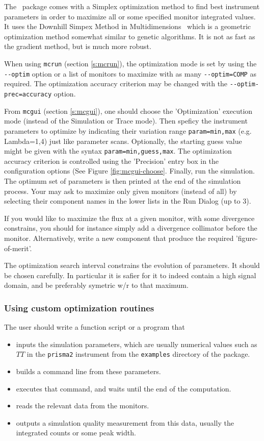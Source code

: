 The \MCS\ package comes with a Simplex optimization method to find best instrument parameters in order to maximize all or some specified monitor integrated values. It uses the Downhill Simpex Method in Multidimensions~\cite{neldermead,NumRecip} which is a geometric optimization method somewhat similar to genetic algorithms. It is not as fast as the gradient method, but is much more robust.

When using \verb+mcrun+ (section \ref{s:mcrun}), the optimization mode is set by using the
\verb+--optim+ option or a list of monitors to maximize with as many
\verb+--optim=COMP+ as required. The optimization accuracy criterion
may be changed with the \verb+--optim-prec=accuracy+ option.

From \verb+mcgui+ (section \ref{s:mcgui}), one should choose the
'Optimization' execution mode (instead of the Simulation or Trace
mode). Then speficy the instrument parameters to optimize by
indicating their variation range \verb+param=min,max+ (e.g. Lambda=1,4) just like
parameter scans. Optionally, the starting guess value might be given with the syntax \verb+param=min,guess,max+. The optimization accuracy criterion is controlled
using the 'Precision' entry box in the configuration options (See
Figure \ref{fig:mcgui-choose}. Finally, run the simulation. The optimum
set of parameters is then printed at the end of the simulation
process. Your may ask to maximize only given monitors (instead of all)
by selecting their component names in the lower lists in the Run Dialog (up to 3).

If you would like to maximize the flux at a given monitor, with some
divergence constrains, you should for instance simply add a divergence
collimator before the monitor. Alternatively, write a new component
that produce the required 'figure-of-merit'.

The optimization search interval constrains the evolution of parameters. It should be chosen carefully. In particular it is safier for it to indeed contain a high signal domain, and be preferably symetric w/r to that maximum.

\subsubsection{Using custom optimization routines}
The user should write a function script or a program that
\begin{itemize}
\item inputs the simulation parameters, which are usually numerical values such as $TT$ in the \verb+prisma2+ instrument from the \verb+examples+ directory of the package.
\item builds a command line from these parameters.
\item executes that command, and waits until the end of the computation.
\item reads the relevant data from the monitors.
\item outputs a simulation quality measurement from this data, usually the integrated counts or some peak width.
\end{itemize}

